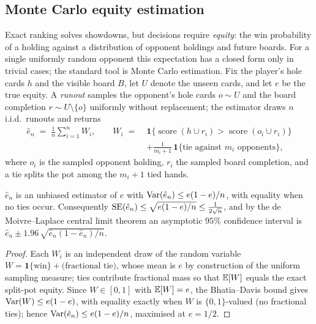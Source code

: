 \subsection{Monte Carlo equity estimation}\label{sec:mc}

Exact ranking solves showdowns, but decisions require \emph{equity}: the win probability of a holding against a distribution of opponent holdings and future boards. For a single uniformly random opponent this expectation has a closed form only in trivial cases; the standard tool is Monte Carlo estimation. Fix the player's hole cards $h$ and the visible board $B$, let $U$ denote the unseen cards, and let $e$ be the true equity. A \emph{runout} samples the opponent's hole cards $o \sim U$ and the board completion $r \sim U \setminus \{o\}$ uniformly without replacement; the estimator draws $n$ i.i.d.\ runouts and returns
\begin{equation}\label{eq:mcest}
\begin{split}
\hat e_n \;=\; \frac{1}{n}\sum_{i=1}^{n} W_i, \qquad
W_i \;=\;{}& \mathbf{1}\{\operatorname{score}(h \cup r_i) > \operatorname{score}(o_i \cup r_i)\} \\
&+ \tfrac{1}{m_i + 1}\,\mathbf{1}\{\text{tie against $m_i$ opponents}\},
\end{split}
\end{equation}
where $o_i$ is the sampled opponent holding, $r_i$ the sampled board completion, and a tie splits the pot among the $m_i + 1$ tied hands.

\begin{proposition}\label{prop:mc}
$\hat e_n$ is an unbiased estimator of $e$ with $\operatorname{\mathrm{Var}}(\hat e_n) \le e(1-e)/n$, with equality when no ties occur. Consequently $\operatorname{\mathrm{SE}}(\hat e_n) \le \sqrt{e(1-e)/n} \le \tfrac{1}{2\sqrt n}$, and by the de Moivre--Laplace central limit theorem an asymptotic $95\%$ confidence interval is $\hat e_n \pm 1.96\,\sqrt{\hat e_n(1-\hat e_n)/n}$.
\end{proposition}
\begin{proof}
Each $W_i$ is an independent draw of the random variable $W = \mathbf{1}\{\text{win}\} + \text{(fractional tie)}$, whose mean is $e$ by construction of the uniform sampling measure; ties contribute fractional mass so that $\operatorname{\mathbb{E}}[W]$ equals the exact split-pot equity. Since $W \in [0,1]$ with $\operatorname{\mathbb{E}}[W] = e$, the Bhatia--Davis bound gives $\operatorname{\mathrm{Var}}(W) \le e(1-e)$, with equality exactly when $W$ is $\{0,1\}$-valued (no fractional ties); hence $\operatorname{\mathrm{Var}}(\hat e_n) \le e(1-e)/n$, maximised at $e = 1/2$.
\end{proof}

